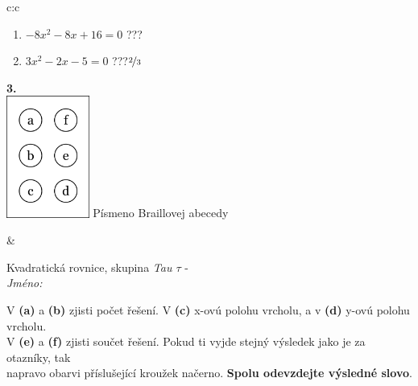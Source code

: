 \documentclass[10pt]{report}
\begin{document}
\begin{tabular}{c:c}
\begin{minipage}[c][104.5mm][t]{0.5\linewidth}
\begin{center}
\begin{minipage}{0.79\linewidth}
\begin{center}
\begin{varwidth}{\linewidth}
\begin{enumerate}
\item $-8x^2-8x+16=0$\quad \dotfill\; ???\;\dotfill {}
\item $3x^2-2x-5=0$\quad \dotfill\; ???\;\dotfill \quad $\nicefrac{2}{3}$
\end{enumerate}
\end{varwidth}
\end{center}
\end{minipage}
\begin{minipage}{0.20\linewidth}
\begin{center}
{\Huge\bfseries 3.} \\[2mm]
\includegraphics[height=40mm]{../images/braille.png}
{\small Písmeno Braillovej abecedy}
\end{center}
\end{minipage}
\end{center}
\end{minipage}
&
\begin{minipage}[c][104.5mm][t]{0.5\linewidth}
\begin{center}
\vspace{7mm}
{\huge Kvadratická rovnice, skupina \textit{Tau $\tau$} -}\\[5mm]
\textit{Jméno:}\phantom{xxxxxxxxxxxxxxxxxxxxxxxxxxxxxxxxxxxxxxxxxxxxxxxxxxxxxxxxxxxxxxxxx}\\[5mm]
\begin{minipage}{0.95\linewidth}
\begin{center}
V \textbf{(a)} a \textbf{(b)} zjisti počet řešení. V \textbf{(c)} x-ovú polohu vrcholu, a v \textbf{(d)} y-ovú polohu vrcholu.\\V \textbf{(e)} a \textbf{(f)} zjisti součet řešení. Pokud ti vyjde stejný výsledek jako je za otazníky, tak\\napravo obarvi příslušející kroužek načerno. \textbf{Spolu odevzdejte výsledné slovo}.
\end{center}
\end{minipage}
\\[1mm]
\begin{minipage}{0.79\linewidth}
\begin{center}

\end{center}
\end{minipage}
\end{center}
\end{minipage}
\end{tabular}
\end{document}
